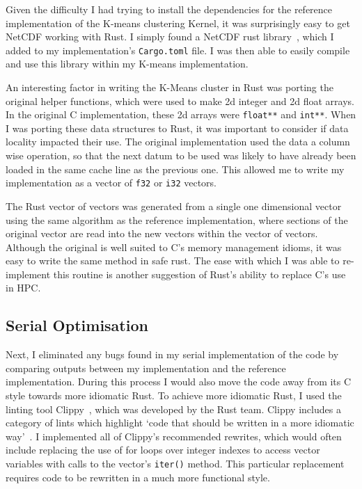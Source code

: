 Given the difficulty I had trying to install the dependencies for the reference implementation of the K-means clustering Kernel, it was surprisingly easy to get NetCDF working with Rust. I simply found a NetCDF rust library~\cite{RustNetCDF}, which I added to my implementation's \texttt{Cargo.toml} file. I was then able to easily compile and use this library within my K-means implementation.

An interesting factor in writing the K-Means cluster in Rust was porting the original helper functions, which were used to make 2d integer and 2d float arrays. In the original C implementation, these 2d arrays were \texttt{float**} and \texttt{int**}. When I was porting these data structures to Rust, it was important to consider if data locality impacted their use. The original implementation used the data a column wise operation, so that the next datum to be used was likely to have already been loaded in the same cache line as the previous one. This allowed me to write my implementation as a vector of \texttt{f32} or \texttt{i32} vectors.

The Rust vector of vectors was generated from a single one dimensional vector using the same algorithm as the reference implementation, where sections of the original vector are read into the new vectors within the vector of vectors. Although the original is well suited to C's memory management idioms, it was easy to write the same method in safe rust. The ease with which I was able to re-implement this routine is another suggestion of Rust's ability to replace C's use in HPC.

\subsection{Serial Optimisation}
Next, I eliminated any bugs found in my serial implementation of the code by comparing outputs between my implementation and the reference implementation. During this process I would also move the code away from its C style towards more idiomatic Rust. To achieve more idiomatic Rust, I used the linting tool Clippy~\cite{RustClippy}, which was developed by the Rust team.  Clippy includes a category of lints  which highlight `code that should be written in a more idiomatic way'~\cite{RustClippy}. I implemented all of Clippy's recommended rewrites, which would often include replacing the use of for loops over integer indexes to access vector variables with calls to the vector's \texttt{iter()} method. This particular replacement requires code to be rewritten in a much more functional style.

